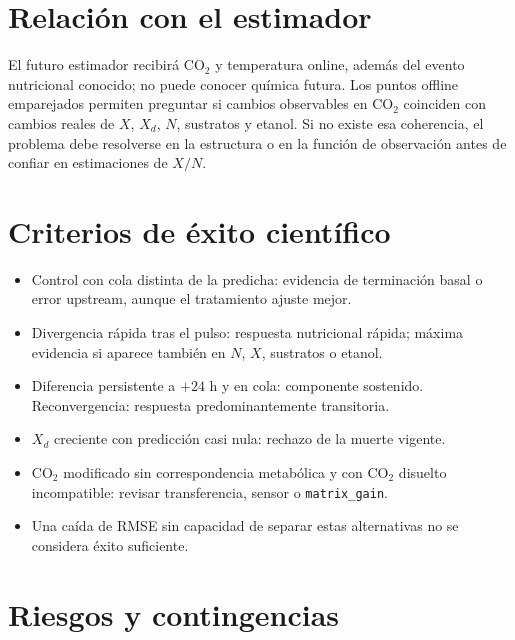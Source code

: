 \documentclass[11pt,a4paper]{article}
\begin{document}
\section{Relación con el estimador}

El futuro estimador recibirá CO$_2$ y temperatura online, además del evento
nutricional conocido; no puede conocer química futura. Los puntos offline
emparejados permiten preguntar si cambios observables en CO$_2$ coinciden con
cambios reales de \(X\), \(X_d\), \(N\), sustratos y etanol. Si no existe esa
coherencia, el problema debe resolverse en la estructura o en la función de
observación antes de confiar en estimaciones de \(X/N\).

\section{Criterios de éxito científico}

\begin{itemize}[leftmargin=*]
  \item Control con cola distinta de la predicha: evidencia de terminación basal
  o error upstream, aunque el tratamiento ajuste mejor.
  \item Divergencia rápida tras el pulso: respuesta nutricional rápida; máxima
  evidencia si aparece también en \(N\), \(X\), sustratos o etanol.
  \item Diferencia persistente a \(+24\) h y en cola: componente sostenido.
  Reconvergencia: respuesta predominantemente transitoria.
  \item \(X_d\) creciente con predicción casi nula: rechazo de la muerte vigente.
  \item CO$_2$ modificado sin correspondencia metabólica y con CO$_2$ disuelto
  incompatible: revisar transferencia, sensor o \texttt{matrix\_gain}.
  \item Una caída de RMSE sin capacidad de separar estas alternativas no se
  considera éxito suficiente.
\end{itemize}

\section{Riesgos y contingencias}
\end{document}
